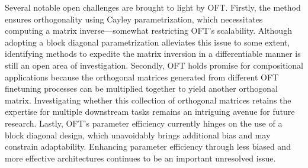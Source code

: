 Several notable open challenges are brought to light by OFT. Firstly, the method ensures orthogonality using Cayley parametrization, which necessitates computing a matrix inverse—somewhat restricting OFT’s scalability. Although adopting a block diagonal parametrization alleviates this issue to some extent, identifying methods to expedite the matrix inversion in a differentiable manner is still an open area of investigation. Secondly, OFT holds promise for compositional applications because the orthogonal matrices generated from different OFT finetuning processes can be multiplied together to yield another orthogonal matrix. Investigating whether this collection of orthogonal matrices retains the expertise for multiple downstream tasks remains an intriguing avenue for future research. Lastly, OFT’s parameter efficiency currently hinges on the use of a block diagonal design, which unavoidably brings additional bias and may constrain adaptability. Enhancing parameter efficiency through less biased and more effective architectures continues to be an important unresolved issue.